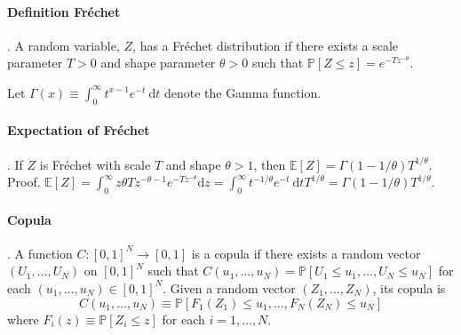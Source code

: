 \paragraph{Definition Fr\'{e}chet}. 
A random variable, $Z$, has a Fr\'{e}chet distribution if there exists a scale parameter $T>0$ 
and shape parameter $\theta>0$ such that $\mathbb{P}[Z \leq z]=e^{-T z^{-\theta}}$.


Let $\Gamma(x) \equiv \int_0^{\infty} t^{x-1} e^{-t} \mathrm{~d} t$ denote the Gamma function.


\paragraph{Expectation of Fr\'{e}chet}.  
If $Z$ is Fr\'{e}chet with scale $T$ and shape $\theta>1$, then $\mathbb{E}[Z]=\Gamma(1-1 / \theta) T^{1 / \theta}$.
\\
Proof. $\mathbb{E}[Z]=\int_0^{\infty} z \theta T z^{-\theta-1} e^{-T z^{-\theta}} \mathrm{d} z=\int_0^{\infty} t^{-1 / \theta} e^{-t} \mathrm{~d} t T^{1 / \theta}=\Gamma(1-1 / \theta) T^{1 / \theta}$.


\paragraph{Copula}.   
A function $C:[0,1]^N \rightarrow[0,1]$ is a copula if there exists a random vector $\left(U_1, \ldots, U_N\right)$ on $[0,1]^N$ such that $C\left(u_1, \ldots, u_N\right)=\mathbb{P}\left[U_1 \leq u_1, \ldots, U_N \leq u_N\right]$ for each $\left(u_1, \ldots, u_N\right) \in[0,1]^N$.
Given a random vector $\left(Z_1, \ldots, Z_N\right)$, its copula is
$$
C\left(u_1, \ldots, u_N\right) \equiv \mathbb{P}\left[F_1\left(Z_1\right) \leq u_1, \ldots, F_N\left(Z_N\right) \leq u_N\right]
$$
where $F_i(z) \equiv \mathbb{P}\left[Z_i \leq z\right]$ for each $i=1, \ldots, N$.